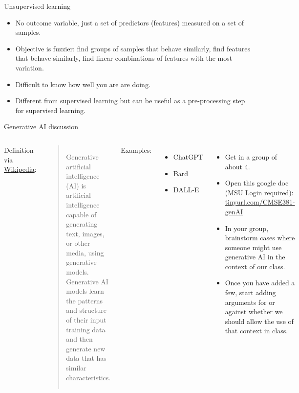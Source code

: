 \documentclass[aspectratio=169,usenames,dvipsnames]{beamer}
\begin{document}
\begin{frame}[c]{Unsupervised learning }

\begin{itemize}
	\item
No outcome variable, just a set of predictors (features) measured on a set of samples.

	\item
Objective is fuzzier:  find groups of samples that behave similarly, find features that behave similarly, find linear combinations of features with the most variation.

	\item
Difficult to know how well you are are doing.

	\item
Different from supervised learning but can be useful as a pre-processing step for supervised learning.
\end{itemize}

\end{frame}
{
\begin{frame}[t]{Generative AI discussion}
\begin{columns}
Definition via \href{https://en.wikipedia.org/wiki/Generative_artificial_intelligence}{Wikipedia}:\\ 
\begin{quote}
	Generative artificial intelligence (AI) is artificial intelligence capable of generating text, images, or other media, using generative models.
	Generative AI models learn the patterns and structure of their input training data and then generate new data that has similar characteristics.
\end{quote}

Examples:
\begin{itemize}
	\item ChatGPT
	\item Bard
	\item DALL-E
\end{itemize}
\centering
\begin{itemize}
	\item Get in a group of about 4. 
	\item Open this google doc (MSU Login required): \href{https://tinyurl.com/CMSE381-genAI}{tinyurl.com/CMSE381-genAI}
	\item In your group, brainstorm cases where someone might use generative AI in the context of our class. 
	\item Once you have added a few, start adding arguments for or against whether we should allow the use of that context in class. 
\end{itemize}
\end{columns}
\end{frame}
}
\end{document}
